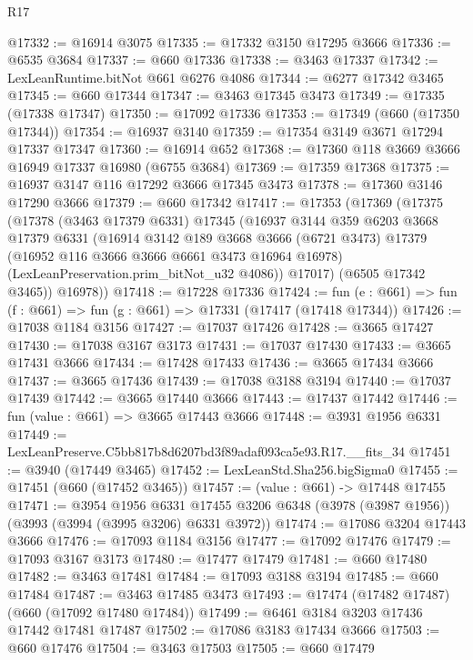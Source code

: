 \begin{lexlean}{R17}
\begin{coremodule}
@17332 := @16914 @3075
@17335 := @17332 @3150 @17295 @3666
@17336 := @6535 @3684
@17337 := @660 @17336
@17338 := @3463 @17337
@17342 := LexLeanRuntime.bitNot @661 @6276 @4086
@17344 := @6277 @17342 @3465
@17345 := @660 @17344
@17347 := @3463 @17345 @3473
@17349 := @17335 (@17338 @17347)
@17350 := @17092 @17336
@17353 := @17349 (@660 (@17350 @17344))
@17354 := @16937 @3140
@17359 := @17354 @3149 @3671 @17294 @17337 @17347
@17360 := @16914 @652
@17368 := @17360 @118 @3669 @3666 @16949 @17337 @16980 (@6755 @3684)
@17369 := @17359 @17368
@17375 := @16937 @3147 @116 @17292 @3666 @17345 @3473
@17378 := @17360 @3146 @17290 @3666
@17379 := @660 @17342
@17417 := @17353
    (@17369
      (@17375
        (@17378
          (@3463 @17379 @6331)
          @17345
          (@16937
            @3144
            @359
            @6203
            @3668
            @17379
            @6331
            (@16914
              @3142
              @189
              @3668
              @3666
              (@6721 @3473)
              @17379
              (@16952 @116 @3666 @3666 @6661 @3473 @16964 @16978)
              (LexLeanPreservation.prim_bitNot_u32 @4086))
            @17017)
          (@6505 @17342 @3465))
        @16978))
@17418 := @17228 @17336
@17424 := fun (e : @661) => fun (f : @661) => fun (g : @661) => @17331 (@17417 (@17418 @17344))
@17426 := @17038 @1184 @3156
@17427 := @17037 @17426
@17428 := @3665 @17427
@17430 := @17038 @3167 @3173
@17431 := @17037 @17430
@17433 := @3665 @17431 @3666
@17434 := @17428 @17433
@17436 := @3665 @17434 @3666
@17437 := @3665 @17436
@17439 := @17038 @3188 @3194
@17440 := @17037 @17439
@17442 := @3665 @17440 @3666
@17443 := @17437 @17442
@17446 := fun (value : @661) => @3665 @17443 @3666
@17448 := @3931 @1956 @6331
@17449 := LexLeanPreserve.C5bb817b8d6207bd3f89adaf093ca5e93.R17.__fits_34
@17451 := @3940 (@17449 @3465)
@17452 := LexLeanStd.Sha256.bigSigma0
@17455 := @17451 (@660 (@17452 @3465))
@17457 := (value : @661) -> @17448 @17455
@17471 := @3954
    @1956
    @6331
    @17455
    @3206
    @6348
    (@3978 (@3987 @1956))
    (@3993 (@3994 (@3995 @3206) @6331 @3972))
@17474 := @17086 @3204 @17443 @3666
@17476 := @17093 @1184 @3156
@17477 := @17092 @17476
@17479 := @17093 @3167 @3173
@17480 := @17477 @17479
@17481 := @660 @17480
@17482 := @3463 @17481
@17484 := @17093 @3188 @3194
@17485 := @660 @17484
@17487 := @3463 @17485 @3473
@17493 := @17474 (@17482 @17487) (@660 (@17092 @17480 @17484))
@17499 := @6461 @3184 @3203 @17436 @17442 @17481 @17487
@17502 := @17086 @3183 @17434 @3666
@17503 := @660 @17476
@17504 := @3463 @17503
@17505 := @660 @17479

\end{coremodule}
\end{lexlean}
